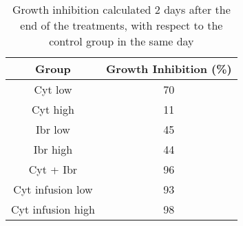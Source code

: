 \begin{table}[]
\begin{tabular}{|c|c|}
\hline
Group             & Growth Inhibition (\%) \\ \hline
Cyt low           & 70                     \\ \hline
Cyt high          & 11                     \\ \hline
Ibr low           & 45                     \\ \hline
Ibr high          & 44                     \\ \hline
Cyt + Ibr         & 96                     \\ \hline
Cyt infusion low  & 93                     \\ \hline
Cyt infusion high & 98                     \\ \hline
\end{tabular}
\caption{Growth inhibition calculated 2 days after the end of the treatments, with respect to the control group in the same day}
\label{tab:my-table}
\end{table}

